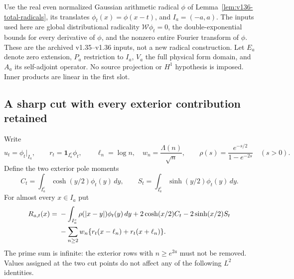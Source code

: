 \documentclass[11pt]{article}
\theoremstyle{remark}
\begin{document}
Use the real even normalized Gaussian arithmetic radical $\phi$ of
Lemma~\ref{lem:v136-total-radicals}, its translates
$\phi_t(x)=\phi(x-t)$, and $I_a=(-a,a)$. The inputs used here are
global distributional radicality $\mathcal W\phi_t=0$, the
double-exponential bounds for every derivative of $\phi$, and the
nonzero entire Fourier transform of $\phi$. These are the archived
v1.35--v1.36 inputs, not a new radical construction. Let $E_a$ denote
zero extension, $P_a$ restriction to $I_a$, $V_a$ the full physical
form domain, and $A_a$ its self-adjoint operator. No source projection
or $H^1$ hypothesis is imposed. Inner products are linear in the first slot.

\subsection*{A sharp cut with every exterior contribution retained}

Write
\[
 u_t=\phi_t|_{I_a},\qquad r_t=\mathbf1_{I_a^c}\phi_t,
 \qquad \ell_n=\log n,\quad w_n=\frac{\Lambda(n)}{\sqrt n},
 \qquad \rho(s)=\frac{e^{-s/2}}{1-e^{-2s}}\quad(s>0).
\]
Define the two exterior pole moments
\[
 C_t=\int_{I_a^c}\cosh(y/2)\phi_t(y)\,dy,\qquad
 S_t=\int_{I_a^c}\sinh(y/2)\phi_t(y)\,dy.
\]
For almost every $x\in I_a$ put
\begin{align}
 R_{a,t}(x)={}&-\int_{I_a^c}\rho(|x-y|)\phi_t(y)\,dy
       +2\cosh(x/2)C_t-2\sinh(x/2)S_t\notag\\
 &-\sum_{n\ge2}w_n\{r_t(x-\ell_n)+r_t(x+\ell_n)\}.
 \label{eq:ns58-exterior-row}
\end{align}
The prime sum is infinite: the exterior rows with $n\ge e^{2a}$
must not be removed. Values assigned at the two cut points do not
affect any of the following $L^2$ identities.
\end{document}
